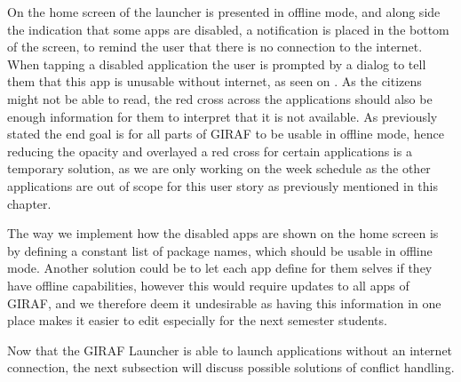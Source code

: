 On  the home screen of the launcher is presented in offline mode, and along side the indication that some apps are disabled, a notification is placed in the bottom of the screen, to remind the user that there is no connection to the internet.
When tapping a disabled application the user is prompted by a dialog to tell them that this app is unusable without internet, as seen on .
As the citizens might not be able to read, the red cross across the applications should also be enough information for them to interpret that it is not available.
As previously stated the end goal is for all parts of GIRAF to be usable in offline mode, hence reducing the opacity and overlayed a red cross for certain applications is a temporary solution, as we are only working on the week schedule as the other applications are out of scope for this user story as previously mentioned in this chapter.

The way we implement how the disabled apps are shown on the home screen is by defining a constant list of package names, which should be usable in offline mode.
Another solution could be to let each app define for them selves if they have offline capabilities, however this would require updates to all apps of GIRAF, and we therefore deem it undesirable as having this information in one place makes it easier to edit especially for the next semester students.

Now that the GIRAF Launcher is able to launch applications without an internet connection, the next subsection will discuss possible solutions of conflict handling.

